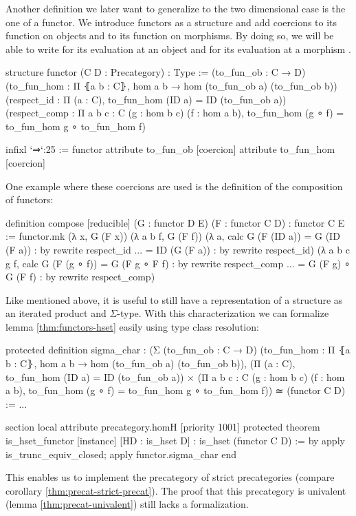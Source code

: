 Another definition we later want to generalize to the two dimensional case is the one
of a functor.
We introduce functors as a structure and add coercions to its function on objects
and to its function on morphisms.
By doing so, we will be able to write  for its evaluation at an object
 and  for its evaluation at a morphism .
\begin{leancode}
structure functor (C D : Precategory) : Type :=
  (to_fun_ob : C → D)
  (to_fun_hom : Π ⦃a b : C⦄, hom a b → hom (to_fun_ob a) (to_fun_ob b))
  (respect_id : Π (a : C), to_fun_hom (ID a) = ID (to_fun_ob a))
  (respect_comp : Π {a b c : C} (g : hom b c) (f : hom a b),
    to_fun_hom (g ∘ f) = to_fun_hom g ∘ to_fun_hom f)

infixl `⇒`:25 := functor
attribute to_fun_ob [coercion]
attribute to_fun_hom [coercion]
\end{leancode}

One example where these coercions are used is the definition of the composition
of functors:
\begin{leancode}
definition compose [reducible] (G : functor D E) (F : functor C D) :
  functor C E :=
functor.mk
  (λ x, G (F x))
  (λ a b f, G (F f))
  (λ a, calc
    G (F (ID a)) = G (ID (F a)) : by rewrite respect_id
             ... = ID (G (F a)) : by rewrite respect_id)
  (λ a b c g f, calc
    G (F (g ∘ f)) = G (F g ∘ F f)     : by rewrite respect_comp
              ... = G (F g) ∘ G (F f) : by rewrite respect_comp)
\end{leancode}

Like mentioned above, it is useful to still have a representation of a structure
as an iterated product and $\Sigma$-type.
With this characterization we can formalize lemma \ref{thm:functors-hset} easily
using type class resolution:
\begin{leancode}
protected definition sigma_char :
  (Σ (to_fun_ob : C → D)
  (to_fun_hom : Π ⦃a b : C⦄, hom a b → hom (to_fun_ob a) (to_fun_ob b)),
  (Π (a : C), to_fun_hom (ID a) = ID (to_fun_ob a)) ×
  (Π {a b c : C} (g : hom b c) (f : hom a b),
    to_fun_hom (g ∘ f) = to_fun_hom g ∘ to_fun_hom f)) ≃ (functor C D) :=
...

section
  local attribute precategory.homH [priority 1001]
  protected theorem is_hset_functor [instance]
    [HD : is_hset D] : is_hset (functor C D) :=
  by apply is_trunc_equiv_closed; apply functor.sigma_char
end
\end{leancode}

This enables us to implement the precategory of strict precategories (compare
corollary \ref{thm:precat-strict-precat}).
The proof that this precategory is univalent (lemma \ref{thm:precat-univalent})
still lacks a formalization.

